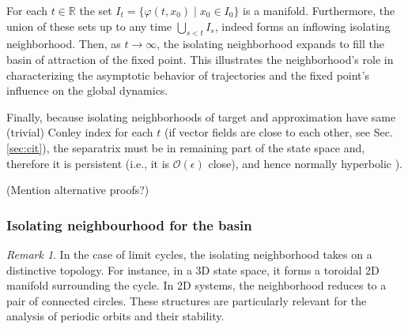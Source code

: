 \documentclass{article}
\newcommand{\ascomment}[1]{\textcolor{ascolor}{(#1)}}
\theoremstyle{definition} \newtheorem{definition}{Definition}
\theoremstyle{remark} \newtheorem{remark}{Remark}
\newcommand{\reals}{\mathbb{R}}
\newcounter{ct}
\begin{document}
For each $t\in\reals$ the set $I_t = \{\varphi(t,x_0) \mid x_0 \in I_0 \}$ is a manifold.
Furthermore, the union of these sets up to any time  $\bigcup_{s<t}I_s$, indeed forms an inflowing isolating neighborhood.
%
Then, as $t\rightarrow\infty$, the isolating neighborhood expands to fill the basin of attraction of the fixed point.
 This illustrates the neighborhood’s role in characterizing the asymptotic behavior of trajectories and the fixed point’s influence on the global dynamics.

Finally, because isolating neighborhoods of target and approximation have same (trivial) Conley index  for each $t$ (if vector fields are close to each other, see Sec.\ref{sec:cit}),
the separatrix must be in remaining part of the state space and, therefore it is persistent (i.e., it is $\mathcal{O}(\epsilon)$ close), and hence normally hyperbolic \citep{mane1978persistent}).

\ascomment{Mention alternative proofs?}


\subsubsection{Isolating neighbourhood for the basin}\label{sec:isonbhd}
\begin{remark}%
In the case of limit cycles, the isolating neighborhood takes on a distinctive topology. For instance, in a 3D state space, it forms a toroidal 2D manifold surrounding the cycle. In 2D systems, the neighborhood reduces to a pair of connected circles. These structures are particularly relevant for the analysis of periodic orbits and their stability.
 \end{remark}


%
\end{document}

